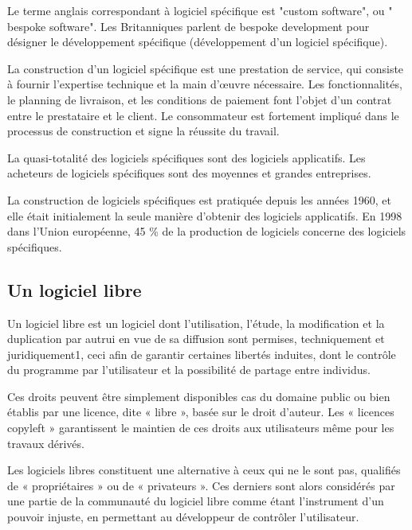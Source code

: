 Le terme anglais correspondant à logiciel spécifique est "custom software", ou "
bespoke software". Les Britanniques parlent de bespoke development pour désigner le
développement spécifique (développement d'un logiciel spécifique).

La construction d'un logiciel spécifique est une prestation de service, qui consiste à fournir
l'expertise technique et la main d'œuvre nécessaire. Les fonctionnalités, le planning de livraison,
et les conditions de paiement font l'objet d'un contrat entre le prestataire et le client.
Le consommateur est fortement impliqué dans le processus de construction et signe la réussite du travail.

La quasi-totalité des logiciels spécifiques sont des logiciels applicatifs. Les acheteurs de
logiciels spécifiques sont des moyennes et grandes entreprises.

La construction de logiciels spécifiques est pratiquée depuis les années 1960, et elle
était initialement la seule manière d'obtenir des logiciels applicatifs. En 1998 dans
l'Union européenne, 45 \% de la production de logiciels concerne des logiciels spécifiques.

\subsection{Un logiciel libre}\label{subsec:logiciel-libre}
Un logiciel libre\cite{logiciel_libre} est un logiciel dont l'utilisation, l'étude, la modification et la duplication par
autrui en vue de sa diffusion sont permises, techniquement et juridiquement1, ceci afin de
garantir certaines libertés induites, dont le contrôle du programme par l'utilisateur et la
possibilité de partage entre individus.

Ces droits peuvent être simplement disponibles cas du domaine public ou bien établis par une licence,
dite « libre », basée sur le droit d'auteur. Les « licences copyleft » garantissent le maintien de ces
droits aux utilisateurs même pour les travaux dérivés.

Les logiciels libres constituent une alternative à ceux qui ne le sont pas, qualifiés de
« propriétaires » ou de « privateurs ». Ces derniers sont alors considérés par une partie de
la communauté du logiciel libre comme étant l'instrument d'un pouvoir injuste, en permettant au
développeur de contrôler l'utilisateur.

